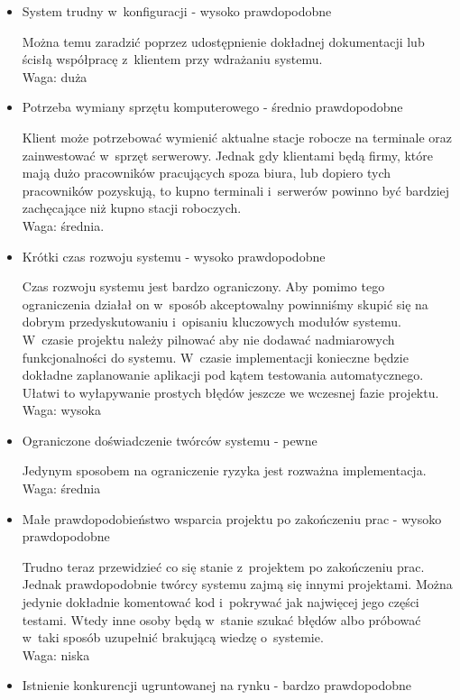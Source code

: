 \documentclass[../wstep.tex]{subfiles}
\begin{document}
\begin{itemize}
    \item System trudny w~konfiguracji - wysoko prawdopodobne

          Można temu zaradzić poprzez udostępnienie dokładnej dokumentacji lub ścisłą współpracę z~klientem przy wdrażaniu systemu. \\
          Waga: duża
    \item Potrzeba wymiany sprzętu komputerowego - średnio prawdopodobne

          Klient może potrzebować wymienić aktualne stacje robocze na terminale oraz zainwestować w~sprzęt serwerowy. Jednak gdy klientami będą firmy, które mają dużo pracowników pracujących spoza biura, lub dopiero tych pracowników pozyskują, to kupno terminali i~serwerów powinno być bardziej zachęcające niż kupno stacji roboczych.\\
          Waga: średnia.
    \item Krótki czas rozwoju systemu - wysoko prawdopodobne

          Czas rozwoju systemu jest bardzo ograniczony. Aby pomimo tego ograniczenia działał on w~sposób akceptowalny powinniśmy skupić się na dobrym przedyskutowaniu i~opisaniu kluczowych modułów systemu. W~czasie projektu należy pilnować aby nie dodawać nadmiarowych funkcjonalności do systemu. W~czasie implementacji konieczne będzie dokładne zaplanowanie aplikacji pod kątem testowania automatycznego. Ułatwi to wyłapywanie prostych błędów jeszcze we wczesnej fazie projektu.\\
          Waga: wysoka
    \item Ograniczone doświadczenie twórców systemu - pewne

          Jedynym sposobem na ograniczenie ryzyka jest rozważna implementacja.\\
          Waga: średnia
    \item Małe prawdopodobieństwo wsparcia projektu po zakończeniu prac - wysoko prawdopodobne

          Trudno teraz przewidzieć co się stanie z~projektem po zakończeniu prac. Jednak prawdopodobnie twórcy systemu zajmą się innymi projektami. Można jedynie dokładnie komentować kod i~pokrywać jak najwięcej jego części testami. Wtedy inne osoby będą w~stanie szukać błędów albo próbować w~taki sposób uzupełnić brakującą wiedzę o~systemie.\\
          Waga: niska
    \item Istnienie konkurencji ugruntowanej na rynku - bardzo prawdopodobne


\end{itemize}
\end{document}
